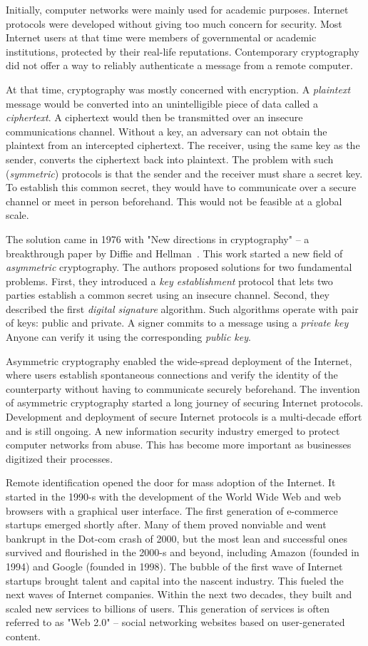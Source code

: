 Initially, computer networks were mainly used for academic purposes.
Internet protocols were developed without giving too much concern for security.
Most Internet users at that time were members of governmental or academic institutions, protected by their real-life reputations.
Contemporary cryptography did not offer a way to reliably authenticate a message from a remote computer.

At that time, cryptography was mostly concerned with encryption.
A \textit{plaintext} message would be converted into an unintelligible piece of data called a \textit{ciphertext}.
A ciphertext would then be transmitted over an insecure communications channel.
Without a key, an adversary can not obtain the plaintext from an intercepted ciphertext.
The receiver, using the same key as the sender, converts the ciphertext back into plaintext.
The problem with such (\textit{symmetric}) protocols is that the sender and the receiver must share a secret key.
To establish this common secret, they would have to communicate over a secure channel or meet in person beforehand.
This would not be feasible at a global scale.

The solution came in 1976 with "New directions in cryptography" -- a breakthrough paper by Diffie and Hellman~\cite{Diffie1976}.
This work started a new field of \textit{asymmetric} cryptography.
The authors proposed solutions for two fundamental problems.
First, they introduced a \textit{key establishment} protocol that lets two parties establish a common secret using an insecure channel.
Second, they described the first \textit{digital signature} algorithm.
Such algorithms operate with pair of keys: public and private.
A signer commits to a message using a \textit{private key}
Anyone can verify it using the corresponding \textit{public key}.

Asymmetric cryptography enabled the wide-spread deployment of the Internet, where users establish spontaneous connections and verify the identity of the counterparty without having to communicate securely beforehand.
The invention of asymmetric cryptography started a long journey of securing Internet protocols.
Development and deployment of secure Internet protocols is a multi-decade effort and is still ongoing.
A new information security industry emerged to protect computer networks from abuse.
This has become more important as businesses digitized their processes.

Remote identification opened the door for mass adoption of the Internet.
It started in the 1990-s with the development of the World Wide Web and web browsers with a graphical user interface.
The first generation of e-commerce startups emerged shortly after.
Many of them proved nonviable and went bankrupt in the Dot-com crash of 2000, but the most lean and successful ones survived and flourished in the 2000-s and beyond, including Amazon (founded in 1994) and Google (founded in 1998).
The bubble of the first wave of Internet startups brought talent and capital into the nascent industry.
This fueled the next waves of Internet companies.
Within the next two decades, they built and scaled new services to billions of users.
This generation of services is often referred to as "Web 2.0" -- social networking websites based on user-generated content.


